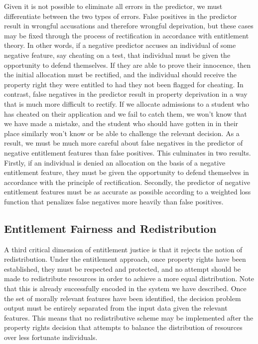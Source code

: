 Given it is not possible to eliminate all errors in the predictor, we must 
differentiate between the two types of errors. False positives in the predictor
result in wrongful accusations and therefore wrongful deprivation, but these 
cases may be fixed through the process of rectification in accordance with 
entitlement theory. In other words, if a negative predictor accuses an
individual of some negative feature, say cheating on a test, that individual 
must be given the opportunity to defend themselves. If they are able to prove 
their innocence, then the initial allocation must be rectified, and the
individual should receive the property right they were entitled to had they not
been flagged for cheating. In contrast, false negatives in the predictor result
in property deprivation in a way that is much more difficult to rectify. If we
allocate admissions to a student who has cheated on their application and we 
fail to catch them, we won't know that we have made a mistake, and the student
who should have gotten in in their place similarly won't know or be able to
challenge the relevant decision. As a result, we must be much more careful about
false negatives in the predictor of negative entitlement features than false 
positives. This culminates in two results. Firstly, if an individual is denied
an allocation on the basis of a negative entitlement feature, they must be given
the opportunity to defend themselves in accordance with the principle of
rectification. Secondly, the predictor of negative entitlement features must be
as accurate as possible according to a weighted loss function that penalizes false
negatives more heavily than false positives. 

\subsection{Entitlement Fairness and Redistribution}

A third critical dimension of entitlement justice is that it rejects the notion
of redistribution. Under the entitlement approach, once property rights have
been established, they must be respected and protected, and no attempt should be
made to redistribute resources in order to achieve a more equal distribution.
Note that this is already successfully encoded in the system we have described.
Once the set of morally relevant features have been identified, the decision
problem output must be entirely separated from the input data given the relevant
features. This means that no redistributive scheme may be implemented after the
property rights decision that attempts to balance the distribution of resources
over less fortunate individuals.

